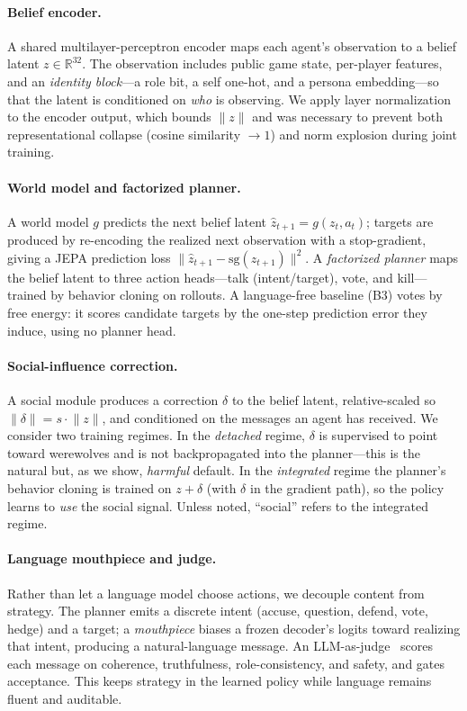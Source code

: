 \documentclass[11pt]{article}
\begin{document}
\paragraph{Belief encoder.} A shared multilayer-perceptron encoder maps each
agent's observation to a belief latent $z \in \mathbb{R}^{32}$. The observation
includes public game state, per-player features, and an \emph{identity block}---a
role bit, a self one-hot, and a persona embedding---so that the latent is
conditioned on \emph{who} is observing. We apply layer
normalization~\citep{ba2016layernorm} to the encoder output, which bounds
$\lVert z \rVert$ and was necessary to prevent both representational collapse
(cosine similarity $\to 1$) and norm explosion during joint training.

\paragraph{World model and factorized planner.} A world model $g$ predicts the
next belief latent $\hat z_{t+1} = g(z_t, a_t)$; targets are produced by
re-encoding the realized next observation with a stop-gradient, giving a JEPA
prediction loss $\lVert \hat z_{t+1} - \text{sg}(z_{t+1}) \rVert^2$. A
\emph{factorized planner} maps the belief latent to three action heads---talk
(intent/target), vote, and kill---trained by behavior cloning on rollouts. A
language-free baseline (B3) votes by free energy: it scores candidate targets by
the one-step prediction error they induce, using no planner head.

\paragraph{Social-influence correction.} A social module produces a correction
$\delta$ to the belief latent, relative-scaled so
$\lVert \delta \rVert = s \cdot \lVert z \rVert$, and conditioned on the messages
an agent has received. We consider two training regimes. In the \emph{detached}
regime, $\delta$ is supervised to point toward werewolves and is not backpropagated
into the planner---this is the natural but, as we show, \emph{harmful} default. In
the \emph{integrated} regime the planner's behavior cloning is trained on
$z + \delta$ (with $\delta$ in the gradient path), so the policy learns to
\emph{use} the social signal. Unless noted, ``social'' refers to the integrated
regime.

\paragraph{Language mouthpiece and judge.} Rather than let a language model choose
actions, we decouple content from strategy. The planner emits a discrete intent
(accuse, question, defend, vote, hedge) and a target; a \emph{mouthpiece} biases a
frozen decoder's logits toward realizing that intent, producing a natural-language
message. An LLM-as-judge~\citep{zhao2023llmjudge} scores each message on
coherence, truthfulness, role-consistency, and safety, and gates acceptance. This
keeps strategy in the learned policy while language remains fluent and auditable.
\end{document}
